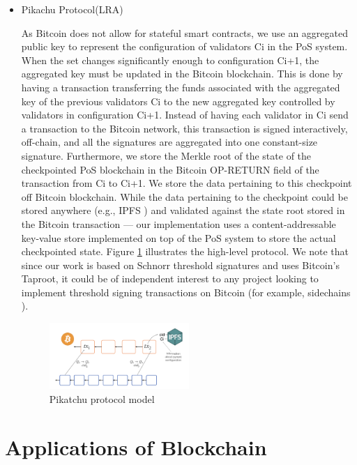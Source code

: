 \begin{itemize}
\item Pikachu Protocol(LRA)

As Bitcoin does not allow for stateful smart contracts, we use an aggregated public key to represent the configuration of validators Ci in the \ac{PoS} system. When the set changes significantly enough to configuration Ci+1, the aggregated key must be updated in the Bitcoin blockchain. This is done by having a transaction transferring the funds associated with the aggregated key of the previous validators Ci to the new aggregated key controlled by validators in configuration Ci+1. Instead of having each validator in Ci send a transaction to the Bitcoin network, this transaction is signed interactively, off-chain, and all the signatures are aggregated into one constant-size signature. Furthermore, we store the Merkle root of the state of the checkpointed \ac{PoS} blockchain in the Bitcoin OP-RETURN field of the transaction from Ci to Ci+1. We store the data pertaining to this checkpoint off Bitcoin blockchain. While the data pertaining to the checkpoint could be stored anywhere (e.g., IPFS \cite{protocollabs_ipfs}) and validated against the state root stored in the Bitcoin transaction — our implementation uses a content-addressable key-value store implemented on top of the \ac{PoS} system to store the actual checkpointed state. Figure \ref{fig:Pikatchu protocol model} illustrates the high-level protocol. We note that since our work is based on Schnorr threshold signatures and uses Bitcoin’s Taproot, it could be of independent interest to any project looking to implement threshold signing transactions on Bitcoin (for example, sidechains \cite{bell_proof-of-stake}).


 \begin{figure}[H]
 \centering
  \includegraphics[width=0.5\textwidth]{pikatchu.png}
  \caption{Pikatchu protocol model}
  \label{fig:Pikatchu protocol model}
\end{figure}
\end{itemize}

\section{Applications of Blockchain}

